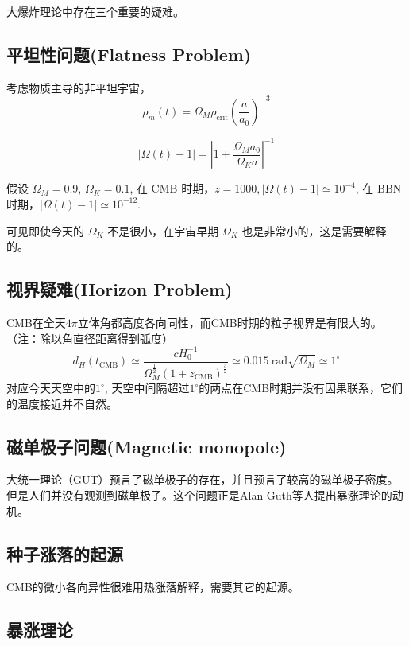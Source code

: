 \documentclass[]{ctexart}
\begin{document}
大爆炸理论中存在三个重要的疑难。

\subsection{平坦性问题(Flatness Problem)}
考虑物质主导的非平坦宇宙，
\begin{equation}
    \rho_m(t) = \Omega_M \rho_\text{crit} \left( \frac{a}{a_0}\right)^{-3}
\end{equation}

\begin{equation}
    |\Omega(t)-1| = \left|1+\frac{\Omega_M a_0}{\Omega_K a}\right|^{-1}
\end{equation}
%

假设 $\Omega_M = 0.9$, $\Omega_K = 0.1$, 
在 CMB 时期，$z=1000,  |\Omega(t)-1|  \simeq 10^{-4}$,
在 BBN 时期，$ |\Omega(t)-1|  \simeq  10^{-12}$.

可见即使今天的 $\Omega_K$ 不是很小，在宇宙早期  $\Omega_K$ 也是非常小的，这是需要解释的。

\subsection{视界疑难(Horizon Problem)}

CMB在全天$4\pi$立体角都高度各向同性，而CMB时期的粒子视界是有限大的。（注：除以角直径距离得到弧度）
\begin{equation}
    d_H (t_\text{CMB}) \simeq \frac{cH_0^{-1}}{\Omega_M^\frac{1}{2}\left(1+z_\text{CMB}\right)^\frac{3}{2} } \simeq 0.015 \mathrm{~rad} \sqrt{\Omega_M} \simeq 1^\circ 
\end{equation}
对应今天天空中的$1^\circ $, 天空中间隔超过$1^\circ $的两点在CMB时期并没有因果联系，它们的温度接近并不自然。

\subsection{磁单极子问题(Magnetic monopole)}

大统一理论（GUT）预言了磁单极子的存在，并且预言了较高的磁单极子密度。但是人们并没有观测到磁单极子。这个问题正是Alan Guth等人提出暴涨理论的动机。

\subsection{种子涨落的起源}

CMB的微小各向异性很难用热涨落解释，需要其它的起源。

\subsection{暴涨理论}
\end{document}
